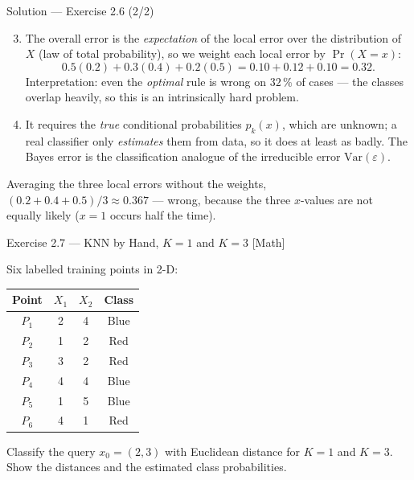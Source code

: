 \documentclass[aspectratio=169,11pt]{beamer}
\begin{document}
\begin{frame}{Solution --- Exercise 2.6 (2/2)}
\begin{solutionbox}
\begin{enumerate}\setcounter{enumi}{2}
  \item The overall error is the \emph{expectation} of the local error
        over the distribution of $X$ (law of total probability), so we
        weight each local error by $\Pr(X=x)$:
        \[
          0.5(0.2)+0.3(0.4)+0.2(0.5)=0.10+0.12+0.10=\mathbf{0.32}.
        \]
        Interpretation: even the \emph{optimal} rule is wrong on
        $32\,\%$ of cases --- the classes overlap heavily, so this is
        an intrinsically hard problem.
  \item It requires the \emph{true} conditional probabilities
        $p_k(x)$, which are unknown; a real classifier only
        \emph{estimates} them from data, so it does at least as badly.
        The Bayes error is the classification analogue of the
        irreducible error $\mathrm{Var}(\varepsilon)$.
\end{enumerate}
\end{solutionbox}
\begin{mistake}
Averaging the three local errors without the
weights, $(0.2+0.4+0.5)/3\approx0.367$ --- wrong, because the three
$x$-values are not equally likely ($x=1$ occurs half the time).
\end{mistake}
\end{frame}

\begin{frame}{Exercise 2.7 --- KNN by Hand, $K=1$ and $K=3$ [Math]}
\begin{exercise}
Six labelled training points in 2-D:
\begin{center}\footnotesize
\begin{tabular}{cccc}
\toprule
Point & $X_1$ & $X_2$ & Class \\
\midrule
$P_1$ & 2 & 4 & Blue \\
$P_2$ & 1 & 2 & Red \\
$P_3$ & 3 & 2 & Red \\
$P_4$ & 4 & 4 & Blue \\
$P_5$ & 1 & 5 & Blue \\
$P_6$ & 4 & 1 & Red \\
\bottomrule
\end{tabular}
\end{center}
Classify the query $x_0=(2,3)$ with Euclidean distance for
\textbf{$K=1$} and \textbf{$K=3$}. Show the distances and the
estimated class probabilities.
\end{exercise}
\end{frame}
\end{document}
